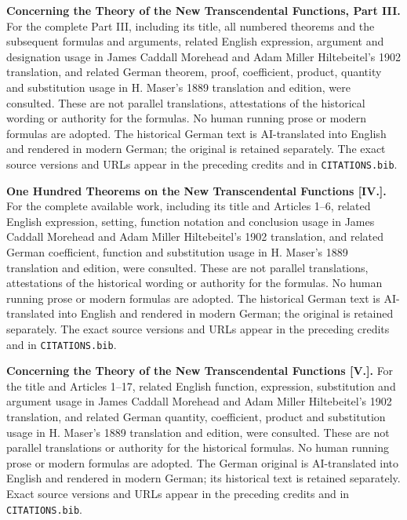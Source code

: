 \clearpage\thispagestyle{empty}\begingroup\fontsize{9}{9.5}\selectfont\raggedright
{}\medskip
\par\medskip\textbf{Concerning the Theory of the New Transcendental Functions, Part III.} For the complete Part III, including its title, all numbered theorems and the subsequent formulas and arguments, related English expression, argument and designation usage in James Caddall Morehead and Adam Miller Hiltebeitel’s 1902 translation, and related German theorem, proof, coefficient, product, quantity and substitution usage in H. Maser’s 1889 translation and edition, were consulted. These are not parallel translations, attestations of the historical wording or authority for the formulas. No human running prose or modern formulas are adopted. The historical German text is AI-translated into English and rendered in modern German; the original is retained separately. The exact source versions and URLs appear in the preceding credits and in \texttt{CITATIONS.bib}.
\par\medskip\textbf{One Hundred Theorems on the New Transcendental Functions [IV.].} For the complete available work, including its title and Articles 1--6, related English expression, setting, function notation and conclusion usage in James Caddall Morehead and Adam Miller Hiltebeitel’s 1902 translation, and related German coefficient, function and substitution usage in H. Maser’s 1889 translation and edition, were consulted. These are not parallel translations, attestations of the historical wording or authority for the formulas. No human running prose or modern formulas are adopted. The historical German text is AI-translated into English and rendered in modern German; the original is retained separately. The exact source versions and URLs appear in the preceding credits and in \texttt{CITATIONS.bib}.
\par\endgroup\clearpage
\thispagestyle{empty}\begingroup\fontsize{9}{9.5}\selectfont\raggedright
{}\medskip
\textbf{Concerning the Theory of the New Transcendental Functions [V.].} For the title and Articles 1--17, related English function, expression, substitution and argument usage in James Caddall Morehead and Adam Miller Hiltebeitel’s 1902 translation, and related German quantity, coefficient, product and substitution usage in H. Maser’s 1889 translation and edition, were consulted. These are not parallel translations or authority for the historical formulas. No human running prose or modern formulas are adopted. The German original is AI-translated into English and rendered in modern German; its historical text is retained separately. Exact source versions and URLs appear in the preceding credits and in \texttt{CITATIONS.bib}.
